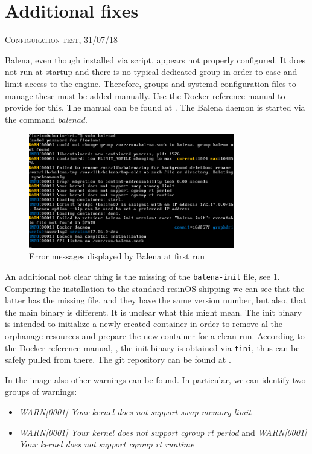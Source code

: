 \documentclass[]{scrartcl}
\begin{document}
\section{Additional fixes}
{\small\textsc{Configuration test, 31/07/18} \bigskip}

Balena, even though installed via script, appears not properly configured. It does not run at startup and there is no typical dedicated group in order to ease and limit access to the engine.
Therefore, groups and systemd configuration files to manage these must be added manually. Use the Docker reference manual to provide for this. The manual can be found at \cite{docker02}. The Balena daemon is started via the command \textit{balenad}.

\begin{figure}[t]
	\centering
	\includegraphics[width=0.8\textwidth]{balena-err}
	\caption{Error messages displayed by Balena at first run}
	\label{fig:balenad}
\end{figure}

An additional not clear thing is the missing of the \texttt{balena-init} file, see \ref{fig:balenad}. Comparing the installation to the standard resinOS shipping we can see that the latter has the missing file, and they have the same version number, but also, that the main binary is different. It is unclear what this might mean. The init binary is intended to initialize a newly created container in order to remove al the orphanage resources and prepare the new container for a clean run. According to the Docker reference manual, \cite{docker03}, the init binary is obtained via \texttt{tini}, thus can be safely pulled from there. The git repository can be found at \cite{tini01}.

In the image also other warnings can be found. In particular, we can identify two groups of warnings:

\begin{itemize}
	\item \textit{WARN[0001] Your kernel does not support swap memory limit}

	\item \textit{WARN[0001] Your kernel does not support cgroup rt period} and \textit{WARN[0001] Your kernel does not support cgroup rt runtime} 
\end{itemize}
\end{document}
